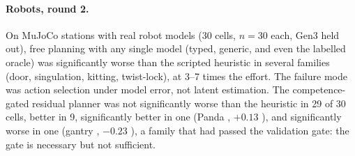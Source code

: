\begin{table}[!htbp]
  \centering\small
  \caption{Synthetic world: change in success relative to the scripted heuristic ($n = 300$ paired episodes,
  3 training seeds). 95\% CI shown for the typed planner where reported. Last column: value of latent
  (oracle $-$ prior-mean). Effort ratios are omitted.}
  \label{tab:synth}
\end{table}

\paragraph{Robots, round 2.} On MuJoCo stations with real robot models (30 cells, $n = 30$ each, Gen3 held
out), free planning with any single model (typed, generic, and even the labelled oracle) was significantly
worse than the scripted heuristic in several families (door, singulation, kitting, twist-lock), at 3--7 times
the effort. The failure mode was action selection under model error, not latent estimation.
The competence-gated residual planner was not significantly worse than the heuristic in 29 of 30 cells,
better in 9, significantly better in one (Panda , $+0.13$ ), and significantly worse
in one (gantry , $-0.23$ ), a family that had passed the validation gate:
the gate is necessary but not sufficient.

